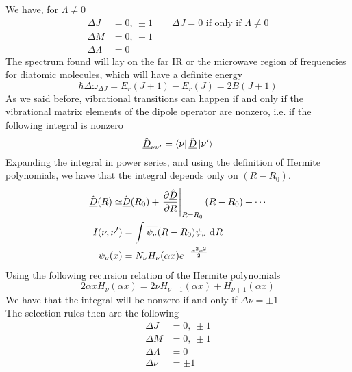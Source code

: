 \documentclass[../qm.tex]{subfiles}
\begin{document}
	We have, for $\Lambda\ne0$
	\begin{equation*}
		\begin{aligned}
			\Delta J&=0,\ \pm1\qquad\text{$\Delta J=0$ if only if $\Lambda\ne0$}\\
			\Delta M&=0,\ \pm1\\
			\Delta\Lambda&=0
		\end{aligned}
	\end{equation*}
	The spectrum found will lay on the far IR or the microwave region of frequencies for diatomic molecules, which will have a definite energy
	\begin{equation}
		\hbar\Delta\omega_{\Delta J}=E_r(J+1)-E_r(J)=2B(J+1)
		\label{eq:rotovibrationalspectrum}
	\end{equation}
	As we said before, vibrational transitions can happen if and only if the vibrational matrix elements of the dipole operator are nonzero, i.e. if the following integral is nonzero
	\begin{equation}
		\hat{\underline{D}}_{\nu\nu'}=\bra{\nu}\hat{\underline{D}}\ket{\nu'}
		\label{eq:electronictransitionmol}
	\end{equation}
	Expanding the integral in power series, and using the definition of Hermite polynomials, we have that the integral depends only on $(R-R_0)$.
	\begin{equation}
		\begin{aligned}
			\hat{\underline{D}}(R)\simeq&\hat{\underline{D}}(R_0)+\left.\pdv{\hat{\underline{D}}}{R}\right|_{R=R_0}(R-R_0)+\cdots\\
			I(\nu,\nu')&=\int\overline{\psi_\nu}(R-R_0)\psi_\nu\ \mathrm{d}^{}R\\
			\psi_\nu(x)&=N_\nu H_\nu(\alpha x)e^{-\frac{\alpha^2x^2}{2}}
		\end{aligned}
		\label{eq:calculusintegralelectricdipole}
	\end{equation}
	Using the following recursion relation of the Hermite polynomials
	\begin{equation*}
		2\alpha xH_{\nu}(\alpha x)=2\nu H_{\nu-1}(\alpha x)+H_{\nu+1}(\alpha x)
	\end{equation*}
	We have that the integral will be nonzero if and only if $\Delta\nu=\pm1$\\
	The selection rules then are the following
	\begin{equation}
		\begin{aligned}
			\Delta J&=0,\ \pm1\\
			\Delta M&=0,\ \pm1\\
			\Delta\Lambda&=0\\
			\Delta\nu&=\pm1
		\end{aligned}
		\label{eq:selectionrulesmolecule}
	\end{equation}
\end{document}
